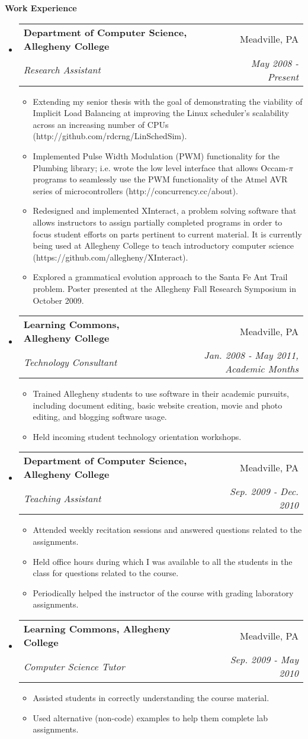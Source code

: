 \documentclass[letterpaper,12pt]{article}
\makeatletter
\newcommand{\resitem}[1]{\item #1 \vspace{-2pt}}
\newcommand{\resheading}[1]{{\large \colorbox{mygrey}{\begin{minipage}{\textwidth}{\textbf{#1 \vphantom{p\^{E}}}}\end{minipage}}}}
\newcommand{\ressubheading}[4]{
\begin{tabular*}{7.0in}{l@{\extracolsep{\fill}}r}
		\textbf{#1} & #2 \\
		\textit{#3} & \textit{#4} \\
\end{tabular*}\vspace{-6pt}}
\makeatother
\begin{document}
\resheading{Work Experience}
\begin{itemize}
\item
	\ressubheading{Department of Computer Science, Allegheny College}{Meadville, PA}{Research Assistant}{May 2008 - Present}
	\begin{itemize}
	    \resitem{Extending my senior thesis with the goal of demonstrating the viability of Implicit Load Balancing at improving the Linux scheduler's scalability across an increasing number of CPUs (http://github.com/rdcrng/LinSchedSim).}
		\resitem{Implemented Pulse Width Modulation (PWM) functionality for the Plumbing library; i.e. wrote the low level interface that allows Occam-$\pi$ programs to seamlessly use the PWM functionality of the Atmel AVR series of microcontrollers (http://concurrency.cc/about).}
		\resitem{Redesigned and implemented XInteract, a problem solving software that allows instructors to assign partially completed programs in order to focus student efforts on parts pertinent to current material. It is currently being used at Allegheny College to teach introductory computer science (https://github.com/allegheny/XInteract).}
		\resitem{Explored a grammatical evolution approach to the Santa Fe Ant Trail problem. Poster presented at the Allegheny Fall Research Symposium in October 2009.}
	\end{itemize}
	
\item
	\ressubheading{Learning Commons, Allegheny College}{Meadville, PA}{Technology Consultant}{Jan. 2008 - May 2011, Academic Months}
	\begin{itemize}
		\resitem{Trained Allegheny students to use software in their academic pursuits, including document editing, basic website creation, movie and photo editing, and blogging software usage.}
		\resitem{Held incoming student technology orientation workshops.}
	\end{itemize}

\item
	\ressubheading{Department of Computer Science, Allegheny College}{Meadville, PA}{Teaching Assistant}{Sep. 2009 - Dec. 2010}
	\begin{itemize}
		\resitem{Attended weekly recitation sessions and answered questions related to the assignments.}
		\resitem{Held office hours during which I was available to all the students in the class for questions related to the course.}
		\resitem{Periodically helped the instructor of the course with grading laboratory assignments.}
	\end{itemize}

\item
	\ressubheading{Learning Commons, Allegheny College}{Meadville, PA}{Computer Science Tutor}{Sep. 2009 - May 2010}
	\begin{itemize}
		\resitem{Assisted students in correctly understanding the course material.}
		\resitem{Used alternative (non-code) examples to help them complete lab assignments.}
	\end{itemize}
	
\end{itemize}
\end{document}
